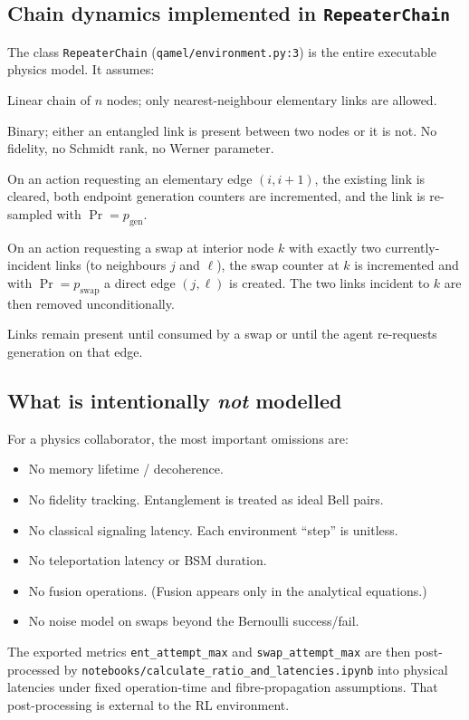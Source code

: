 \documentclass[11pt]{article}
\newcommand{\code}[1]{\texttt{#1}}
\newcommand{\file}[1]{\texttt{\small #1}}
\newcommand{\pgen}{p_{\text{gen}}}
\newcommand{\pswap}{p_{\text{swap}}}
\begin{document}
\subsection{Chain dynamics implemented in \code{RepeaterChain}}
The class \code{RepeaterChain} (\file{qamel/environment.py:3}) is the entire executable physics model. It assumes:
\begin{description}[leftmargin=2.2em,style=nextline]
  \item[Topology] Linear chain of $n$ nodes; only nearest-neighbour elementary links are allowed.
  \item[Link representation] Binary; either an entangled link is present between two nodes or it is not. No fidelity, no Schmidt rank, no Werner parameter.
  \item[Generation] On an action requesting an elementary edge $(i,i+1)$, the existing link is cleared, both endpoint generation counters are incremented, and the link is re-sampled with $\Pr=\pgen$.
  \item[Swapping] On an action requesting a swap at interior node $k$ with exactly two currently-incident links (to neighbours $j$ and $\ell$), the swap counter at $k$ is incremented and with $\Pr=\pswap$ a direct edge $(j,\ell)$ is created. The two links incident to $k$ are then removed unconditionally.
  \item[Persistence] Links remain present until consumed by a swap or until the agent re-requests generation on that edge.
\end{description}

\subsection{What is intentionally \emph{not} modelled}
For a physics collaborator, the most important omissions are:
\begin{itemize}
  \item No memory lifetime / decoherence.
  \item No fidelity tracking. Entanglement is treated as ideal Bell pairs.
  \item No classical signaling latency. Each environment ``step'' is unitless.
  \item No teleportation latency or BSM duration.
  \item No fusion operations. (Fusion appears only in the analytical equations.)
  \item No noise model on swaps beyond the Bernoulli success/fail.
\end{itemize}
The exported metrics \code{ent\_attempt\_max} and \code{swap\_attempt\_max} are then post-processed by \file{notebooks/calculate\_ratio\_and\_latencies.ipynb} into physical latencies under fixed operation-time and fibre-propagation assumptions. That post-processing is external to the RL environment.
\end{document}
